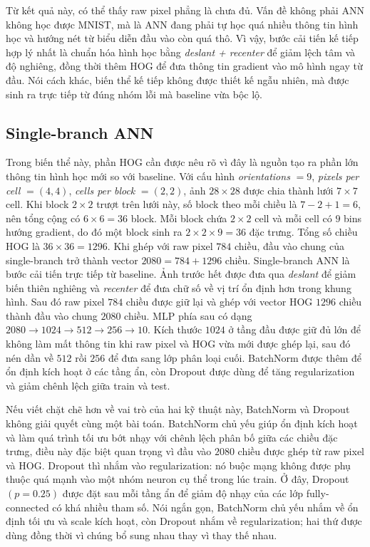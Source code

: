 Từ kết quả này, có thể thấy raw pixel phẳng là chưa đủ. Vấn đề không phải ANN không học được MNIST, mà là ANN đang phải tự học quá nhiều thông tin hình học và hướng nét từ biểu diễn đầu vào còn quá thô. Vì vậy, bước cải tiến kế tiếp hợp lý nhất là chuẩn hóa hình học bằng \textit{deslant + recenter} để giảm lệch tâm và độ nghiêng, đồng thời thêm HOG để đưa thông tin gradient vào mô hình ngay từ đầu. Nói cách khác, biến thể kế tiếp không được thiết kế ngẫu nhiên, mà được sinh ra trực tiếp từ đúng nhóm lỗi mà baseline vừa bộc lộ.

\subsection{Single-branch ANN}

Trong biến thể này, phần HOG cần được nêu rõ vì đây là nguồn tạo ra phần lớn thông tin hình học mới so với baseline. Với cấu hình \textit{orientations} $= 9$, \textit{pixels per cell} $= (4,4)$, \textit{cells per block} $= (2,2)$, ảnh $28 \times 28$ được chia thành lưới $7 \times 7$ cell. Khi block $2 \times 2$ trượt trên lưới này, số block theo mỗi chiều là $7 - 2 + 1 = 6$, nên tổng cộng có $6 \times 6 = 36$ block. Mỗi block chứa $2 \times 2$ cell và mỗi cell có $9$ bins hướng gradient, do đó một block sinh ra $2 \times 2 \times 9 = 36$ đặc trưng. Tổng số chiều HOG là $36 \times 36 = 1296$. Khi ghép với raw pixel $784$ chiều, đầu vào chung của single-branch trở thành vector $2080 = 784 + 1296$ chiều.
Single-branch ANN là bước cải tiến trực tiếp từ baseline. Ảnh trước hết được đưa qua \textit{deslant} để giảm biến thiên nghiêng và \textit{recenter} để đưa chữ số về vị trí ổn định hơn trong khung hình. Sau đó raw pixel $784$ chiều được giữ lại và ghép với vector HOG $1296$ chiều thành đầu vào chung $2080$ chiều. MLP phía sau có dạng $2080 \rightarrow 1024 \rightarrow 512 \rightarrow 256 \rightarrow 10$. Kích thước $1024$ ở tầng đầu được giữ đủ lớn để không làm mất thông tin khi raw pixel và HOG vừa mới được ghép lại, sau đó nén dần về $512$ rồi $256$ để đưa sang lớp phân loại cuối. BatchNorm được thêm để ổn định kích hoạt ở các tầng ẩn, còn Dropout được dùng để tăng regularization và giảm chênh lệch giữa train và test.

Nếu viết chặt chẽ hơn về vai trò của hai kỹ thuật này, BatchNorm và Dropout không giải quyết cùng một bài toán. BatchNorm chủ yếu giúp ổn định kích hoạt và làm quá trình tối ưu bớt nhạy với chênh lệch phân bố giữa các chiều đặc trưng, điều này đặc biệt quan trọng vì đầu vào $2080$ chiều được ghép từ raw pixel và HOG. Dropout thì nhắm vào regularization: nó buộc mạng không được phụ thuộc quá mạnh vào một nhóm neuron cụ thể trong lúc train. Ở đây, Dropout $(p=0.25)$ được đặt sau mỗi tầng ẩn để giảm độ nhạy của các lớp fully-connected có khá nhiều tham số. Nói ngắn gọn, BatchNorm chủ yếu nhắm về ổn định tối ưu và scale kích hoạt, còn Dropout nhắm về regularization; hai thứ được dùng đồng thời vì chúng bổ sung nhau thay vì thay thế nhau.

